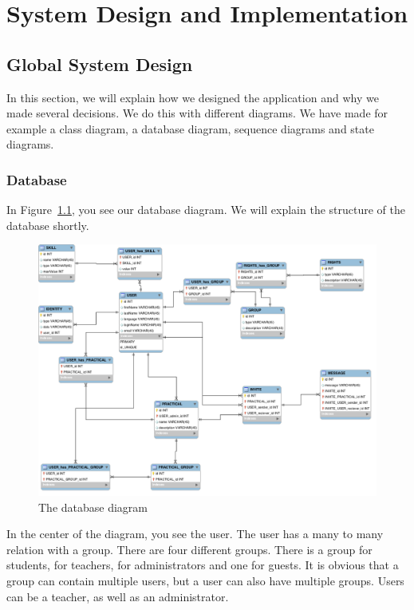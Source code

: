 \chapter{System Design and Implementation}

\section{Global System Design}
In this section, we will explain how we designed the application and why we made several decisions.
We do this with different diagrams.
We have made for example a class diagram, a database diagram, sequence diagrams and state diagrams.

\subsection{Database}
In Figure~\ref{database_diagram}, you see our database diagram.
We will explain the structure of the database shortly.

\begin{figure}[h]
    \centering
    \captionsetup{justification=centering}
    \includegraphics[width=\textwidth, frame]{images/database_diagram}
    \caption{The database diagram}
    \label{database_diagram}
\end{figure}

In the center of the diagram, you see the user.
The user has a many to many relation with a group.
There are four different groups.
There is a group for students, for teachers, for administrators and one for guests.
It is obvious that a group can contain multiple users, but a user can also have multiple groups.
Users can be a teacher, as well as an administrator.

